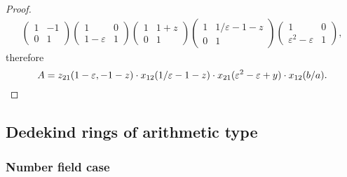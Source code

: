 \begin{proof}
\begin{multline*}
\begin{pmatrix} 1 & -1 \\ 0 & 1 \end{pmatrix}
\begin{pmatrix} 1 & 0 \\ 1-\varepsilon & 1 \end{pmatrix}
\begin{pmatrix} 1 & 1+z \\ 0 & 1 \end{pmatrix}
\begin{pmatrix} 1 & 1/\varepsilon-1-z \\ 0 & 1 \end{pmatrix}
\begin{pmatrix} 1 & 0 \\ \varepsilon^2-\varepsilon & 1 \end{pmatrix},
\end{multline*}
therefore
\[
A=z_{21}(1-\varepsilon,-1-z)\cdot x_{12}(1/\varepsilon-1-z)\cdot x_{21}(\varepsilon^2-\varepsilon+y)\cdot x_{12}(b/a). \qedhere
\]
\end{proof}

\subsection{Dedekind rings of arithmetic type}
\subsubsection{Number field case}
